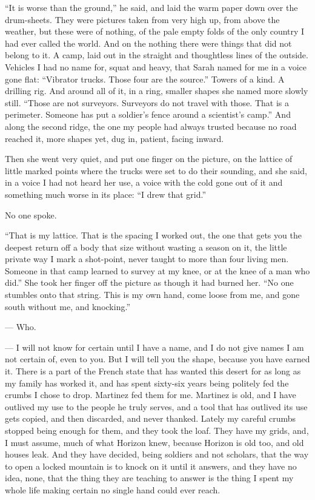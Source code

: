 ``It is worse than the ground,'' he said, and laid the warm paper down over the drum-sheets. They were pictures taken from very high up, from above the weather, but these were of nothing, of the pale empty folds of the only country I had ever called the world. And on the nothing there were things that did not belong to it. A camp, laid out in the straight and thoughtless lines of the outside. Vehicles I had no name for, squat and heavy, that Sarah named for me in a voice gone flat: ``Vibrator trucks. Those four are the source.'' Towers of a kind. A drilling rig. And around all of it, in a ring, smaller shapes she named more slowly still. ``Those are not surveyors. Surveyors do not travel with those. That is a perimeter. Someone has put a soldier's fence around a scientist's camp.'' And along the second ridge, the one my people had always trusted because no road reached it, more shapes yet, dug in, patient, facing inward.\par

Then she went very quiet, and put one finger on the picture, on the lattice of little marked points where the trucks were set to do their sounding, and she said, in a voice I had not heard her use, a voice with the cold gone out of it and something much worse in its place: ``I drew that grid.''\par

No one spoke.\par

``That is my lattice. That is the spacing I worked out, the one that gets you the deepest return off a body that size without wasting a season on it, the little private way I mark a shot-point, never taught to more than four living men. Someone in that camp learned to survey at my knee, or at the knee of a man who did.'' She took her finger off the picture as though it had burned her. ``No one stumbles onto that string. This is my own hand, come loose from me, and gone south without me, and knocking.''\par

\begin{room}

--- Who.

--- I will not know for certain until I have a name, and I do not give names I am not certain of, even to you. But I will tell you the shape, because you have earned it. There is a part of the French state that has wanted this desert for as long as my family has worked it, and has spent sixty-six years being politely fed the crumbs I chose to drop. Martinez fed them for me. Martinez is old, and I have outlived my use to the people he truly serves, and a tool that has outlived its use gets copied, and then discarded, and never thanked. Lately my careful crumbs stopped being enough for them, and they took the loaf. They have my grids, and, I must assume, much of what Horizon knew, because Horizon is old too, and old houses leak. And they have decided, being soldiers and not scholars, that the way to open a locked mountain is to knock on it until it answers, and they have no idea, none, that the thing they are teaching to answer is the thing I spent my whole life making certain no single hand could ever reach.

\end{room}

